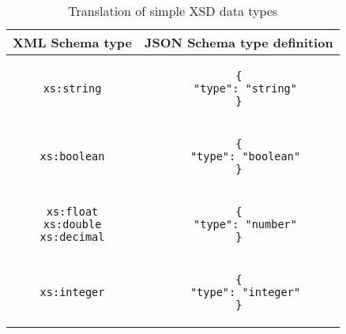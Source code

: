 \lstset{
  frame=none,
  numbers=none
}
\begin{longtable}{c|c}
\caption{Translation of simple XSD data types}
\label{tbl:rules:types}\\

\textbf{XML Schema type} & \textbf{JSON Schema type definition}\\
\hline

\begin{minipage}{.4\textwidth}
  \begin{lstlisting}
xs:string
  \end{lstlisting}
\end{minipage} &
\begin{minipage}{.55\textwidth}
\begin{lstlisting}
{
  "type": "string"
}
\end{lstlisting}
\end{minipage}\\

\hline
\begin{minipage}{.4\textwidth}
  \begin{lstlisting}
xs:boolean
  \end{lstlisting}
\end{minipage} &
\begin{minipage}{.55\textwidth}
\begin{lstlisting}
{
  "type": "boolean"
}
\end{lstlisting}
\end{minipage}\\

\hline
\begin{minipage}{.4\textwidth}
  \begin{lstlisting}
xs:float
xs:double
xs:decimal
  \end{lstlisting}
\end{minipage} &
\begin{minipage}{.55\textwidth}
\begin{lstlisting}
{
  "type": "number"
}
\end{lstlisting}
\end{minipage}\\

\hline
\begin{minipage}{.4\textwidth}
  \begin{lstlisting}
xs:integer
  \end{lstlisting}
\end{minipage} &
\begin{minipage}{.55\textwidth}
\begin{lstlisting}
{
  "type": "integer"
}
\end{lstlisting}
\end{minipage}\\


\end{longtable}
